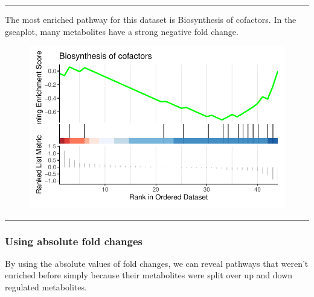 \documentclass[
  24px,
  letterpaper,
  DIV=11,
  numbers=noendperiod]{scrartcl}
\newenvironment{Shaded}{\begin{snugshade}}{\end{snugshade}}
\newcommand{\AttributeTok}[1]{\textcolor[rgb]{0.40,0.45,0.13}{#1}}
\newcommand{\DecValTok}[1]{\textcolor[rgb]{0.68,0.00,0.00}{#1}}
\newcommand{\FunctionTok}[1]{\textcolor[rgb]{0.28,0.35,0.67}{#1}}
\newcommand{\NormalTok}[1]{\textcolor[rgb]{0.00,0.23,0.31}{#1}}
\newcommand{\SpecialCharTok}[1]{\textcolor[rgb]{0.37,0.37,0.37}{#1}}
\begin{document}
\begin{center}\rule{0.5\linewidth}{0.5pt}\end{center}

The most enriched pathway for this dataset is Biosynthesis of cofactors.
In the gseaplot, many metabolites have a strong negative fold change.

\begin{Shaded}
\end{Shaded}

\begin{figure}[H]

{\centering \includegraphics{index_files/figure-pdf/unnamed-chunk-40-1.pdf}

}

\end{figure}

\begin{center}\rule{0.5\linewidth}{0.5pt}\end{center}

\hypertarget{using-absolute-fold-changes-1}{%
\subsubsection{Using absolute fold
changes}\label{using-absolute-fold-changes-1}}

By using the absolute values of fold changes, we can reveal pathways
that weren't enriched before simply because their metabolites were split
over up and down regulated metabolites.
\end{document}
